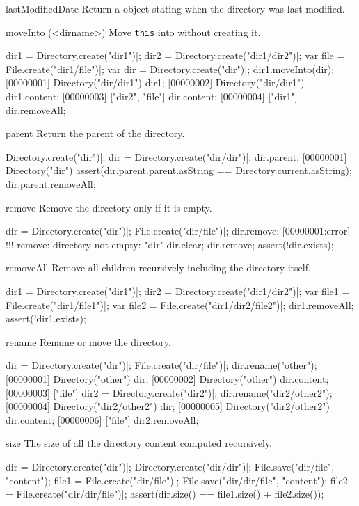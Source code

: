 \begin{urbiscriptapi}
\item[lastModifiedDate]
  Return a  object stating when the directory was last modified.

\item[moveInto](<dirname>)
  Move \lstinline|this| into  without creating it.
\begin{urbiscript}
dir1 = Directory.create("dir1")|;
dir2 = Directory.create("dir1/dir2")|;
var file = File.create("dir1/file")|;
var dir = Directory.create("dir")|;
dir1.moveInto(dir);
[00000001] Directory("dir/dir1")
dir1;
[00000002] Directory("dir/dir1")
dir1.content;
[00000003] ["dir2", "file"]
dir.content;
[00000004] ["dir1"]
dir.removeAll;
\end{urbiscript}

\item[parent]
  Return the parent of the directory.
\begin{urbiscript}
Directory.create("dir")|;
dir = Directory.create("dir/dir")|;
dir.parent;
[00000001] Directory("dir")
assert(dir.parent.parent.asString == Directory.current.asString);
dir.parent.removeAll;
\end{urbiscript}

\item[remove]
  Remove the directory only if it is empty.
\begin{urbiscript}
dir = Directory.create("dir")|;
File.create("dir/file")|;
dir.remove;
[00000001:error] !!! remove: directory not empty: "dir"
dir.clear;
dir.remove;
assert(!dir.exists);
\end{urbiscript}

\item[removeAll]
  Remove all children recursively including the directory itself.
\begin{urbiscript}
dir1 = Directory.create("dir1")|;
dir2 = Directory.create("dir1/dir2")|;
var file1 = File.create("dir1/file1")|;
var file2 = File.create("dir1/dir2/file2")|;
dir1.removeAll;
assert(!dir1.exists);
\end{urbiscript}

\item[rename]
  Rename or move the directory.
\begin{urbiscript}
dir = Directory.create("dir")|;
File.create("dir/file")|;
dir.rename("other");
[00000001] Directory("other")
dir;
[00000002] Directory("other")
dir.content;
[00000003] ["file"]
dir2 = Directory.create("dir2")|;
dir.rename("dir2/other2");
[00000004] Directory("dir2/other2")
dir;
[00000005] Directory("dir2/other2")
dir.content;
[00000006] ["file"]
dir2.removeAll;
\end{urbiscript}

\item[size]
  The size of all the directory content computed recursively.
\begin{urbiscript}
dir = Directory.create("dir")|;
Directory.create("dir/dir")|;
File.save("dir/file", "content");
file1 = File.create("dir/file")|;
File.save("dir/dir/file", "content");
file2 = File.create("dir/dir/file")|;
assert(dir.size() == file1.size() + file2.size());
\end{urbiscript}
\end{urbiscriptapi}

